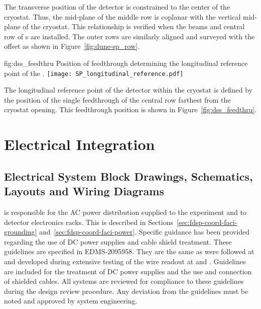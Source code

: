 The transverse position of the detector is constrained to the center
of the cryostat. Thus, the mid-plane of the middle row  is
coplanar with the vertical mid-plane of the cryostat. This
relationship is verified when the  beams and central row of
s are installed. The outer rows are similarly aligned and
surveyed with the offset as shown in Figure~\ref{fig:dune-sp_row}.
\begin{dunefigure}{fig:dss_feedthru}
  {Position of feedthrough determining the longitudinal reference point of the .}
  \texttt{[image: SP\_longitudinal\_reference.pdf]}
\end{dunefigure}


The longitudinal reference point of the detector within the cryostat
is defined by the position of the single feedthrough of the central row
farthest from the cryostat opening. This feedthrough position
is shown in Figure~\ref{fig:dss_feedthru}.






\section{Electrical Integration}
\label{sec:fdsp-Integ-electrical}



\subsection{Electrical System Block Drawings, Schematics, Layouts and Wiring Diagrams}
\label{sec:fdsp-coord-electrical}


 is responsible for the AC power
distribution supplied to the experiment and to detector electronics
racks.  This is described in Sections~\ref{sec:fdsp-coord-faci-grounding} 
and~\ref{sec:fdsp-coord-faci-power}.  Specific guidance has been provided
regarding the use of DC power supplies and cable shield treatment.
These guidelines are specified in EDMS-2095958.  They are the same as
were followed at  and developed during extensive testing of
the  wire readout at  and .  Guidelines are included
for the treatment of DC power supplies and the use and connection of
shielded cables.  All systems are reviewed for compliance to these
guidelines during the design review procedure.  Any deviation from the
guidelines must be noted and approved by system engineering.

